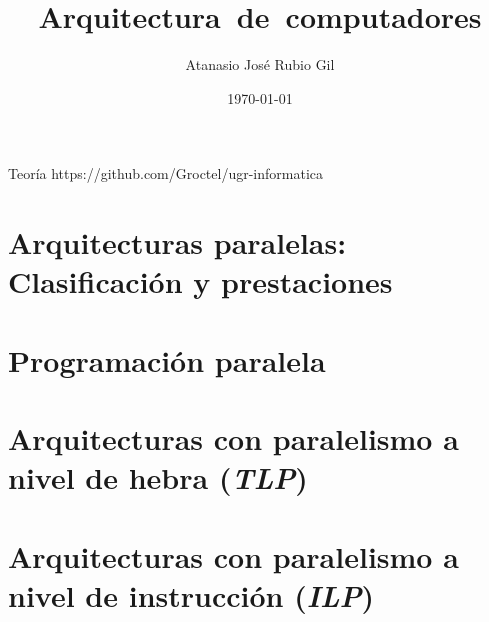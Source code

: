 \documentclass[10pt]{report}
\author{Atanasio José Rubio Gil}
\title{Arquitectura~de~computadores}
\date{\today}
\begin{document}
            {Teoría}
            {https://github.com/Groctel/ugr-informatica}
\tableofcontents

\chapter{Arquitecturas paralelas: Clasificación y prestaciones}\label{arqpar-clasificacion-prestaciones}




\chapter{Programación paralela}\label{progpar}




\chapter{Arquitecturas con paralelismo a nivel de hebra (\textit{TLP})}\label{tlp}

\chapter{Arquitecturas con paralelismo a nivel de instrucción (\textit{ILP})}\label{ilp}
\end{document}
